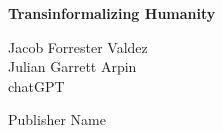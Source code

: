 \begin{titlepage}
    \centering
    \vspace*{4cm} %
    
    \Huge \textbf{Transinformalizing Humanity}
    
    \vspace{2cm}
    
    \Large Jacob Forrester Valdez \\
    Julian Garrett Arpin \\
    chatGPT
    
    \vfill %
    
    \large Publisher Name %
    
    \vspace{0.5cm}
    
    \large {} %
    
\end{titlepage}
